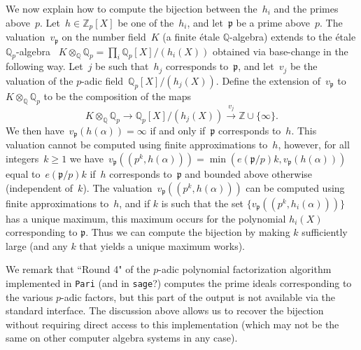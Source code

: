 \documentclass{article}
\def\Z{{\mathbb Z}}
\def\Q{{\mathbb Q}}
\def\p{{\mathfrak p}}
\begin{document}
We now explain how to compute the bijection between the~$h_i$ and the primes
above~$p$. Let~$h\in\Z_p[X]$ be one of the~$h_i$, and let~$\p$ be a prime
above~$p$. The valuation~$v_{\p}$ on the number field~$K$ (a finite \'etale $\Q$-algebra) extends to the \'etale $\Q_p$-algebra ~$K\otimes_{\Q}\Q_p = \prod_i
\Q_p[X]/(h_i(X))$ obtained via base-change in the following way.
Let~$j$ be such that~$h_{j}$ corresponds
to~$\p$, and let~$v_j$ be the valuation of the $p$-adic field~$\Q_p[X]/(h_j(X))$.
Define the extension of~$v_\p$ to $K\otimes_\Q\Q_p$ to be the composition of the maps
\[
  K\otimes_{\Q}\Q_p \longrightarrow \Q_p[X]/(h_j(X)) \stackrel{v_j}{\longrightarrow} \Z\cup\{\infty\}.
\]
We then have~$v_{\p}(h(\alpha)) = \infty$ if and only
if~$\p$ corresponds to~$h$.
This valuation cannot be computed using finite
approximations to~$h$, however, for all integers~$k\ge 1$ we have~$v_\p((p^k,h(\alpha)))
= \min(e(\p/p)k, v_\p(h(\alpha)))$ equal to~$e(\p/p)k$
if~$h$ corresponds to~$\p$ and bounded above otherwise (independent of~$k$). The
valuation~$v_\p((p^k,h(\alpha)))$ can be computed using finite approximations
to~$h$, and if $k$ is such that the set $\{v_\p((p^k,h_i(\alpha)))\}$ has a unique maximum, this maximum occurs for the polynomial $h_i(X)$ corresponding to $\p$.
Thus we can compute the bijection by making $k$ sufficiently large (and any $k$ that yields a unique maximum works).

We remark that ``Round 4" of the $p$-adic polynomial factorization algorithm
implemented in \texttt{Pari} (and in \texttt{sage}?) \cite{Roblot}
computes the prime ideals corresponding to the various $p$-adic factors, but
this part of the output is not available via the standard interface.
The discussion above allows us to recover the bijection without requiring direct access to this implementation (which may not be the same on other computer algebra systems in any case).
\end{document}
